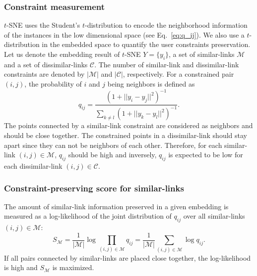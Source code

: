 \subsubsection*{Constraint measurement}
$t$-SNE uses the Student's $t$-distribution to encode the neighborhood information of the instances in the low dimensional space (see Eq.~\ref{eq:q_ij}).
We also use a $t$-distribution in the embedded space to quantify the user constraints preservation.
Let us denote the embedding result of $t$-SNE ${Y} = \{{y_i}\}$, a set of similar-links $\mathcal{M}$ and a set of dissimilar-links $\mathcal{C}$. The number of similar-link and dissimilar-link constraints are denoted by $|\mathcal{M}|$ and $|\mathcal{C}|$, respectively.
For a constrained pair $(i, j)$, the probability of $i$ and $j$ being neighbors is defined as
\begin{equation}\label{equ:q_link}
    q_{ij} = \frac
    { ( 1 + || y_i - y_j ||^2 )^{-1} }
    { \sum_{k \neq l} { ( 1 + ||y_k - y_l||^2 )^{-1} } }.
\end{equation}
The points connected by a similar-link constraint are considered as neighbors and should be close together.
The constrained points in a dissimilar-link should stay apart since they can not be neighbors of each other.
Therefore, for each similar-link $(i,j) \in \mathcal{M}$, $q_{ij}$ should be high and inversely, $q_{ij}$ is expected to be low for each dissimilar-link $(i,j) \in \mathcal{C}$.

\subsubsection*{Constraint-preserving score for similar-links}
The amount of similar-link information preserved in a given embedding is measured as a log-likelihood of the joint distribution of $q_{i j}$ over all similar-links $(i, j) \in \mathcal{M}$:
\begin{equation}
S_{\mathcal{M}} = \frac{1}{|\mathcal{M}|} \log \prod_{(i,j) \in \mathcal{M}} q_{ij}
                = \frac{1}{|\mathcal{M}|} \sum_{(i,j) \in \mathcal{M}} \log q_{ij}.
\end{equation}
If all pairs connected by similar-links are placed close together, the log-likelihood is high and $S_{\mathcal{M}}$ is maximized.

